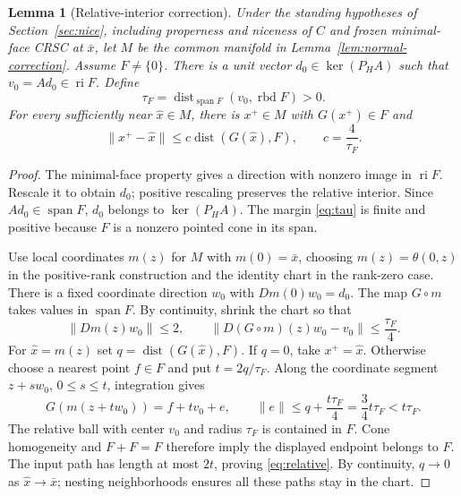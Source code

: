 \documentclass[11pt]{article}
\numberwithin{equation}{section}
\newtheorem{lemma}[theorem]{Lemma}
\theoremstyle{definition}
\theoremstyle{remark}
\DeclareMathOperator{\dist}{dist}
\DeclareMathOperator{\ri}{ri}
\DeclareMathOperator{\rbd}{rbd}
\DeclareMathOperator{\spann}{span}
\newcommand{\xb}{\bar x}
\newcommand{\xhat}{\widehat x}
\newcommand{\norm}[1]{\lVert #1\rVert}
\newcommand{\dset}[2]{\dist(#1,#2)}
\begin{document}
\begin{lemma}[Relative-interior correction]
\label{lem:relative}
Under the standing hypotheses of Section~\ref{sec:nice}, including
properness and niceness of $C$ and frozen minimal-face CRSC at $\xb$,
let $M$ be the common manifold in Lemma~\ref{lem:normal-correction}.
Assume $F\ne\{0\}$. There is a unit vector
$d_0\in\ker(P_HA)$ such that $v_0=Ad_0\in\ri F$. Define
\begin{equation}
 \tau_F=\dist_{\spann F}(v_0,\rbd F)>0.
 \label{eq:tau}
\end{equation}
For every sufficiently near $\xhat\in M$, there is $x^+\in M$ with
$G(x^+)\in F$ and
\begin{equation}
 \norm{x^+-\xhat}\leq c\dset{G(\xhat)}{F},
 \qquad c=\frac{4}{\tau_F}.
 \label{eq:relative}
\end{equation}
\end{lemma}
\begin{proof}
The minimal-face property gives a direction with nonzero image in
$\ri F$. Rescale it to obtain $d_0$; positive rescaling preserves the
relative interior. Since $Ad_0\in\spann F$, $d_0$ belongs to
$\ker(P_HA)$. The margin \eqref{eq:tau} is finite and positive because
$F$ is a nonzero pointed cone in its span.

Use local coordinates $m(z)$ for $M$ with $m(0)=\xb$, choosing
$m(z)=\theta(0,z)$ in the positive-rank construction and the identity
chart in the rank-zero case. There is a fixed coordinate direction $w_0$
with $Dm(0)w_0=d_0$. The map $G\circ m$ takes values in $\spann F$.
By continuity, shrink the chart so that
\[
 \norm{Dm(z)w_0}\leq2,
 \qquad
 \norm{D(G\circ m)(z)w_0-v_0}\leq\frac{\tau_F}{4}.
\]
For $\xhat=m(z)$ set $q=\dset{G(\xhat)}{F}$. If $q=0$, take
$x^+=\xhat$. Otherwise choose a nearest point $f\in F$ and put
$t=2q/\tau_F$. Along the coordinate segment $z+s w_0$, $0\leq s\leq t$,
integration gives
\[
 G(m(z+t w_0))=f+t v_0+e,
 \qquad \norm{e}\leq q+\frac{t\tau_F}{4}
 =\frac{3}{4}t\tau_F<t\tau_F.
\]
The relative ball with center $v_0$ and radius $\tau_F$ is contained
in $F$. Cone homogeneity and $F+F=F$ therefore imply the displayed
endpoint belongs to $F$. The input path has length at most $2t$, proving
\eqref{eq:relative}. By continuity, $q\to0$ as $\xhat\to\xb$;
nesting neighborhoods ensures all these paths stay in the chart.
\end{proof}
\end{document}
